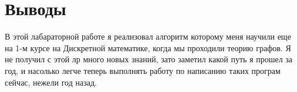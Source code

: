 \section{Выводы}

В этой лабараторной работе я реализовал алгоритм которому меня научили еще на 1-м курсе на Дискретной математике, когда мы проходили теорию графов. Я не получил с этой лр много новых знаний, зато заметил какой путь я прошел за год, и насолько легче теперь выполнять работу по написанию таких програм сейчас, нежели год назад.

\pagebreak